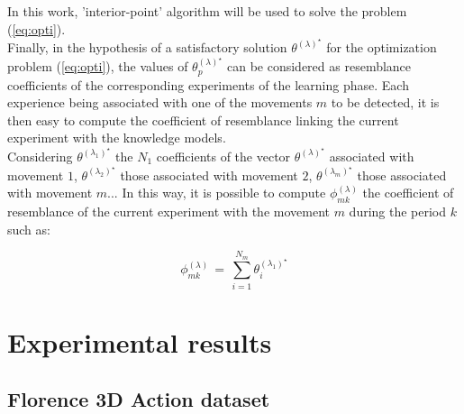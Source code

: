 \documentclass[letterpaper, 10 pt, conference]{ieeeconf}  %
\begin{document}
In this work, 'interior-point' algorithm will be used to solve the problem (\ref{eq:opti}).\\

Finally, in the hypothesis of a satisfactory solution $\theta^{{(\lambda)}^\star}$ for the optimization problem (\ref{eq:opti}), the values of $\theta_p^{(\lambda)^\star}$ can be considered as resemblance coefficients of the corresponding experiments of the learning phase. Each experience being associated with one of the movements $m$ to be detected, it is then easy to compute the coefficient of resemblance linking the current experiment with the knowledge models.\\

Considering $\theta^{{(\lambda_1)}^\star}$ the $N_1$ coefficients of the vector $\theta^{{(\lambda)}^\star}$  associated with movement $1$, $\theta^{{(\lambda_2)}^\star}$ those associated with movement $2$, $\theta^{{(\lambda_m)}^\star}$ those associated with movement $m$... In this way, it is possible to compute $\phi_{mk}^{(\lambda)}$ the coefficient of resemblance of the current experiment with the movement $m$ during the period $k$ such as:

\begin{equation}
		\label{eq:phires}
		\phi_{mk}^{(\lambda)}\,=\,\displaystyle \sum_{i=1}^{N_m}\theta_i^{{(\lambda_1)}^\star}
		 \end{equation}



\section{Experimental results}


\subsection{Florence 3D Action dataset}
\end{document}
